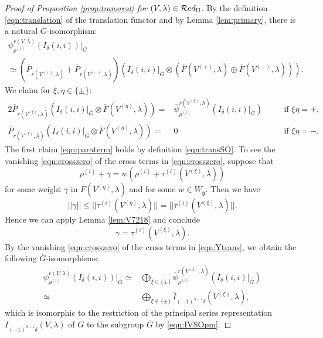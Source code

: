 \begin{proof}
[Proof of Proposition \ref{prop:transrest} for $(V,\lambda) \in {\mathcal{R}}ed_{\operatorname{I I}}$]
By the definition \eqref{eqn:translation}
 of the translation functor
 and by Lemma \ref{lem:primary}, 
 there is a natural $\overline G$-isomorphism:
\begin{multline}
\label{eqn:Ytrans}
   \psi_{\rho^{(i)}}^{r(V,\lambda)}(I_{\delta}(i,i))|_{\overline G} 
\\
  \simeq
  (\overline P_{r(V^{(+)},\lambda)}
   + 
   \overline P_{r(V^{(-)},\lambda)})
  (I_{\delta}(i,i)|_{\overline G}
  \otimes 
  (\overline F(V^{(+)},\lambda) \oplus \overline F(V^{(-)},\lambda))).  
\end{multline}
We claim for $\xi, \eta \in \{\pm\}$: 
\begin{alignat}{2}
\label{eqn:paraterm}
   \overline P_{r(V^{(\xi)},\lambda)}
  (I_{\delta}(i,i)|_{\overline G}
  \otimes 
 \overline F(V^{(\eta)},\lambda))
  =&
  \overline \psi_{\rho^{(i)}}^{r(V^{(\xi)}, \lambda)}(I_{\delta}(i,i)|_{\overline G})
\quad
&&\text{if $\xi \eta =+$}, 
\\
\label{eqn:crosszero}
   \overline P_{r(V^{(\xi)},\lambda)}
  (I_{\delta}(i,i)|_{\overline G}
  \otimes 
  \overline F(V^{(\eta)},\lambda))=&0
\quad
&&\text{if $\xi \eta =-$}.  
\end{alignat}
The first claim \eqref{eqn:paraterm}
 holds by definition \eqref{eqn:transSO}.  
To see the vanishing \eqref{eqn:crosszero}
 of the cross terms in \eqref{eqn:crosszero},
 suppose that 
\[
   \rho^{(i)} + \gamma = w (\rho^{(i)}+ \tau^{(i)}(V^{(\xi)}, \lambda))
\]
for some weight $\gamma$ in $F(V^{(\eta)}, \lambda)$
 and for some $w \in W_{\mathfrak{g}}$.  
Then we have 
\[
   ||\gamma|| \le ||\tau^{(i)}(V^{(\eta)}, \lambda)||=||\tau^{(i)}(V^{(\xi)}, \lambda)||.  
\]
Hence we can apply Lemma \ref{lem:V7218}
 and conclude
\[
  \gamma = \tau^{(i)}(V^{(\xi)}, \lambda).  
\]
By the vanishing \eqref{eqn:crosszero}
 of the cross terms in \eqref{eqn:Ytrans}, 
 we obtain the following $\overline G$-isomorphisms:
\begin{align*}
  \psi_{\rho^{(i)}}^{r(V,\lambda)}(I_{\delta}(i,i))|_{\overline G} 
  \simeq&
  \bigoplus_{\xi \in \{\pm\}}
  \overline \psi_{\rho^{(i)}}^{r(V^{(\xi)},\lambda)}(I_{\delta}(i,i)|_{\overline G}) \\
  \simeq& 
  \bigoplus_{\xi \in \{\pm\}} \overline I_{(-1)^{\lambda-i} \delta}(V^{(\xi)}, \lambda), 
\end{align*}
which is isomorphic to the restriction
 of the principal series representation
 $I_{(-1)^{\lambda-i} \delta}(V, \lambda)$ of $G$
 to the subgroup $\overline G$
 by \eqref{eqn:IVSOpm}.  
\end{proof}

